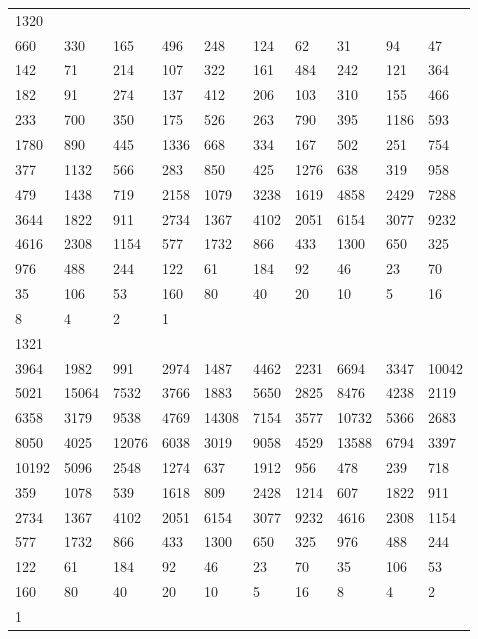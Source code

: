 \begin{longtable}{*{10}{l}}
1320&&&&&&&&&\\
660& 330& 165& 496& 248& 124& 62& 31& 94& 47\\
142& 71& 214& 107& 322& 161& 484& 242& 121& 364\\
182& 91& 274& 137& 412& 206& 103& 310& 155& 466\\
233& 700& 350& 175& 526& 263& 790& 395& 1186& 593\\
1780& 890& 445& 1336& 668& 334& 167& 502& 251& 754\\
377& 1132& 566& 283& 850& 425& 1276& 638& 319& 958\\
479& 1438& 719& 2158& 1079& 3238& 1619& 4858& 2429& 7288\\
3644& 1822& 911& 2734& 1367& 4102& 2051& 6154& 3077& 9232\\
4616& 2308& 1154& 577& 1732& 866& 433& 1300& 650& 325\\
976& 488& 244& 122& 61& 184& 92& 46& 23& 70\\
35& 106& 53& 160& 80& 40& 20& 10& 5& 16\\
8& 4& 2& 1& \\

1321&&&&&&&&&\\
3964& 1982& 991& 2974& 1487& 4462& 2231& 6694& 3347& 10042\\
5021& 15064& 7532& 3766& 1883& 5650& 2825& 8476& 4238& 2119\\
6358& 3179& 9538& 4769& 14308& 7154& 3577& 10732& 5366& 2683\\
8050& 4025& 12076& 6038& 3019& 9058& 4529& 13588& 6794& 3397\\
10192& 5096& 2548& 1274& 637& 1912& 956& 478& 239& 718\\
359& 1078& 539& 1618& 809& 2428& 1214& 607& 1822& 911\\
2734& 1367& 4102& 2051& 6154& 3077& 9232& 4616& 2308& 1154\\
577& 1732& 866& 433& 1300& 650& 325& 976& 488& 244\\
122& 61& 184& 92& 46& 23& 70& 35& 106& 53\\
160& 80& 40& 20& 10& 5& 16& 8& 4& 2\\
1& \\


\end{longtable}
